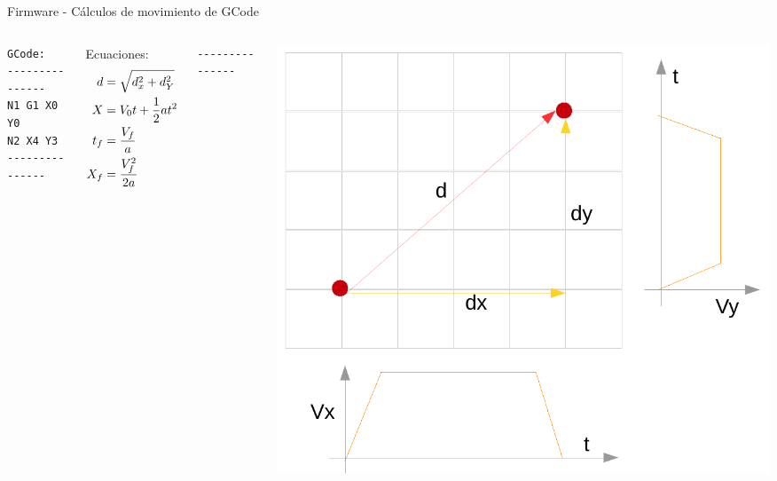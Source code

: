 \documentclass[aspectratio= 43]{beamer}
\begin{document}
\begin{frame}[fragile]{Firmware - Cálculos de movimiento de GCode}
   \begin{columns}
      \begin{lstlisting}
GCode:
---------------
N1 G1 X0 Y0
N2 X4 Y3
---------------
      \end{lstlisting}
Ecuaciones:
      \begin{align}
         \notag
         d   &= \sqrt{d_x^2 + d_Y^2} \\
         \notag 
         X   &= V_0 t + \frac{1}{2} a t^2 \\
         \notag 
         t_f &= \frac{V_f}{a} \\
         \notag 
         X_f &= \frac{V_f^2}{2a}
      \end{align}
      \begin{lstlisting}
---------------
      \end{lstlisting}
      \includegraphics[width=\textwidth, left]{./Figures/gcode.pdf}
   \end{columns}
\end{frame}
\end{document}
